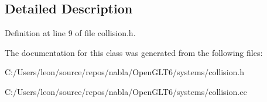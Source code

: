 \subsection{Detailed Description}


Definition at line 9 of file collision.\+h.



The documentation for this class was generated from the following files\+:\begin{DoxyCompactItemize}
\item 
C\+:/\+Users/leon/source/repos/nabla/\+Open\+G\+L\+T6/systems/collision.\+h\item 
C\+:/\+Users/leon/source/repos/nabla/\+Open\+G\+L\+T6/systems/collision.\+cc\end{DoxyCompactItemize}
